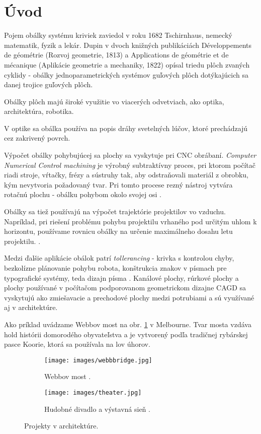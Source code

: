 \chapter*{Úvod} %
Pojem obálky systému kriviek zaviedol v roku 1682 Tschirnhaus, nemecký matematik, fyzik a lekár. Dupin v dvoch knižných publikáciách Développements de géométrie (Rozvoj geometrie, 1813) a Applications de géométrie et de mécanique (Aplikácie geometrie a mechaniky, 1822) opísal triedu plôch zvaných cyklidy - obálky jednoparametrických systémov guľových plôch dotýkajúcich sa danej trojice guľových plôch.

Obálky plôch majú široké využitie vo viacerých odvetviach, ako optika, architektúra, robotika. 

V optike sa obálka používa na popis dráhy svetelných lúčov, ktoré prechádzajú cez zakrivený povrch. 

Výpočet obálky pohybujúcej sa plochy sa vyskytuje pri CNC obrábaní. \textit{Computer Numerical Control machining} je výrobný subtraktívny proces, pri ktorom počítač riadi stroje, vŕtačky, frézy a sústruhy tak, aby odstraňovali materiál z obrobku, kým nevytvoria požadovaný tvar. Pri tomto procese rezný nástroj vytvára rotačnú plochu - obálku pohybom okolo svojej osi \cite{Skop20}. 

Obálky sa tiež používajú na výpočet trajektórie projektilov vo vzduchu. Napríklad, pri riešení problému pohybu projektilu vrhaného pod určitým uhlom k horizontu, používame rovnicu obálky na určenie maximálneho dosahu letu projektilu. \cite{Chud09}. 

Medzi ďalšie aplikácie obálok patrí \textit{tollerancing} - krivka s kontrolou chyby, bezkolízne plánovanie pohybu robota, konštrukcia znakov v písmach pre typografické systémy, teda dizajn písma \cite{Pott09}. Kanálové plochy, rúrkové plochy a plochy používané v počítačom podporovanom geometrickom dizajne CAGD sa vyskytujú ako zmiešavacie a prechodové plochy medzi potrubiami a sú využívané aj v architektúre.

Ako príklad uvádzame Webbov most na obr. \ref{fig:webb_bridge} v Melbourne. Tvar mosta vzdáva hold histórii domorodého obyvateľstva a je vytvorený podľa tradičnej rybárskej pasce Koorie, ktorá sa používala na lov úhorov.

\begin{figure}[h]
    \centering
    \begin{subfigure}[b]{0.6\textwidth}
        \centering
        \texttt{[image: images/webbbridge.jpg]}
        \caption[Webbov most.]{Webbov most \cite{WebbBridge}.}
        \label{fig:webb_bridge}
    \end{subfigure}
    \hfill
    \begin{subfigure}[b]{0.6\textwidth}
        \centering
        \texttt{[image: images/theater.jpg]}
        \caption[Hudobné divadlo a výstavná sieň.]{Hudobné divadlo a výstavná sieň \cite{MusicTheater}.}
        \label{fig:theater}
    \end{subfigure}
    \caption{Projekty v architektúre.}
    \label{fig:projects}
\end{figure}


